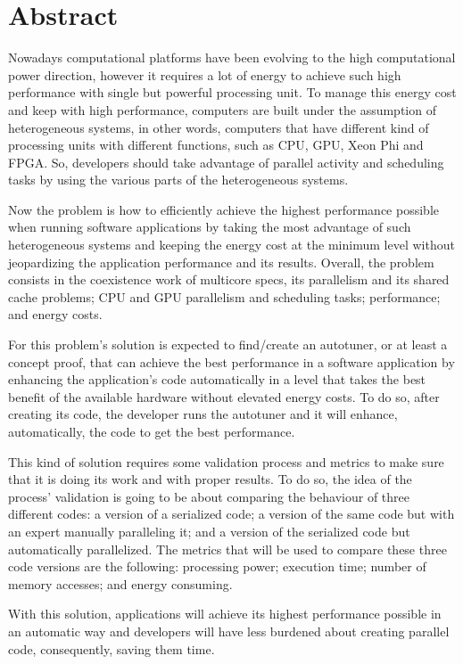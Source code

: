 \chapter*{Abstract}

Nowadays computational platforms have been evolving to the high computational power direction, however it requires a lot of energy to achieve such high performance with single but powerful processing unit.
To manage this energy cost and keep with high performance, computers are built under the assumption of heterogeneous systems, in other words, computers that have different kind of processing units with different functions, such as CPU, GPU, Xeon Phi and FPGA. 
So, developers should take advantage of parallel activity and scheduling tasks by using the various parts of the heterogeneous systems.

Now the problem is how to efficiently achieve the highest performance possible when running software applications by taking the most advantage of such heterogeneous systems and keeping the energy cost at the minimum level without jeopardizing the application performance and its results. 
Overall, the problem consists in the coexistence work of multicore specs, its parallelism and its shared cache problems; CPU and GPU parallelism and scheduling tasks; performance; and energy costs.

For this problem's solution is expected to find/create an autotuner, or at least a concept proof, that can achieve the best performance in a software application by enhancing the application's code automatically in a level that takes the best benefit of the available hardware without elevated energy costs. To do so, after creating its code, the developer runs the autotuner and it will enhance, automatically, the code to get the best performance.

This kind of solution requires some validation process and metrics to make sure that it is doing its work and with proper results. To do so, the idea of the process' validation is going to be about comparing the behaviour of three different codes: a version of  a serialized code; a version of the same code but with an expert manually paralleling it; and a version of the serialized code but automatically parallelized. The metrics that will be used to compare these three code versions are the following: processing power; execution time; number of memory accesses; and energy consuming. 

With this solution, applications will achieve its highest performance possible in an automatic way and developers will have less burdened about creating parallel code, consequently, saving them time.

